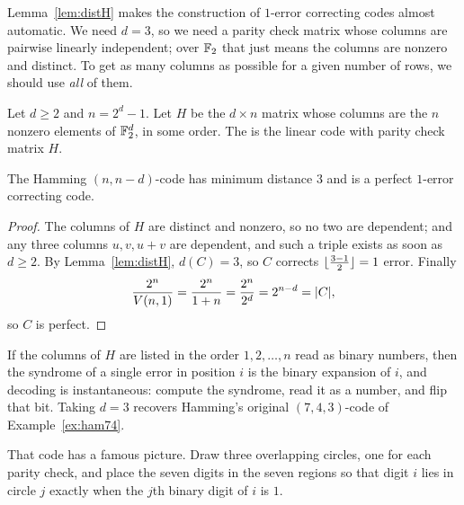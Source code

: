 \documentclass[a4paper]{scrartcl}
\DeclarePairedDelimiter{\floor}{\lfloor}{\rfloor}
\begin{document}
Lemma~\ref{lem:distH} makes the construction of $1$-error correcting codes almost automatic. We need $d = 3$, so we need a parity check matrix whose columns are pairwise linearly independent; over $\mathbb{F}_2$ that just means the columns are nonzero and distinct. To get as many columns as possible for a given number of rows, we should use \emph{all} of them.

\begin{definition}
	Let $d \ge 2$ and $n = 2^d - 1$. Let $H$ be the $d\times n$ matrix whose columns are the $n$ nonzero elements of $\mathbb{F}_2^d$, in some order. The  is the linear code with parity check matrix $H$.
\end{definition}

\begin{lemma}
	The Hamming $(n,n-d)$-code has minimum distance $3$ and is a perfect $1$-error correcting code.
\end{lemma}

\begin{proof}
	The columns of $H$ are distinct and nonzero, so no two are dependent; and any three columns $u,v,u+v$ are dependent, and such a triple exists as soon as $d \ge 2$. By Lemma~\ref{lem:distH}, $d(C) = 3$, so $C$ corrects $\floor{\frac{3-1}{2}} = 1$ error. Finally
	$$\frac{2^n}{V(n,1)} = \frac{2^n}{1+n} = \frac{2^n}{2^d} = 2^{n-d} = \lvert C\rvert,$$
	so $C$ is perfect.
\end{proof}

If the columns of $H$ are listed in the order $1, 2, \dots, n$ read as binary numbers, then the syndrome of a single error in position $i$ is the binary expansion of $i$, and decoding is instantaneous: compute the syndrome, read it as a number, and flip that bit. Taking $d = 3$ recovers Hamming's original $(7,4,3)$-code of Example~\ref{ex:ham74}.

That code has a famous picture. Draw three overlapping circles, one for each parity check, and place the seven digits in the seven regions so that digit $i$ lies in circle $j$ exactly when the $j$th binary digit of $i$ is $1$.

\begin{center}
\end{center}
\end{document}
